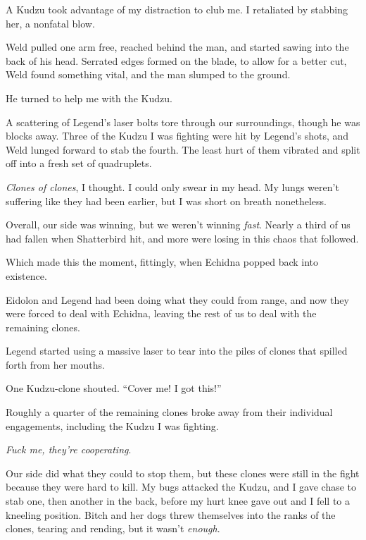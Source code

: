 A Kudzu took advantage of my distraction to club me.  I retaliated by stabbing her, a nonfatal blow.



Weld pulled one arm free, reached behind the man, and started sawing into the back of his head.  Serrated edges formed on the blade, to allow for a better cut, Weld found something vital, and the man slumped to the ground.



He turned to help me with the Kudzu.



A scattering of Legend's laser bolts tore through our surroundings, though he was blocks away.  Three of the Kudzu I was fighting were hit by Legend's shots, and Weld lunged forward to stab the fourth.  The least hurt of them vibrated and split off into a fresh set of quadruplets.



\emph{Clones of clones}, I thought.  I could only swear in my head.  My lungs weren't suffering like they had been earlier, but I was short on breath nonetheless.



Overall, our side was winning, but we weren't winning \emph{fast}.  Nearly a third of us had fallen when Shatterbird hit, and more were losing in this chaos that followed.



Which made this the moment, fittingly, when Echidna popped back into existence.



Eidolon and Legend had been doing what they could from range, and now they were forced to deal with Echidna, leaving the rest of us to deal with the remaining clones.



Legend started using a massive laser to tear into the piles of clones that spilled forth from her mouths.



One Kudzu-clone shouted.  ``Cover me!  I got this!''



Roughly a quarter of the remaining clones broke away from their individual engagements, including the Kudzu I was fighting.



\emph{Fuck me, they're cooperating}.



Our side did what they could to stop them, but these clones were still in the fight because they were hard to kill.  My bugs attacked the Kudzu, and I gave chase to stab one, then another in the back, before my hurt knee gave out and I fell to a kneeling position.  Bitch and her dogs threw themselves into the ranks of the clones, tearing and rending, but it wasn't \emph{enough}.



